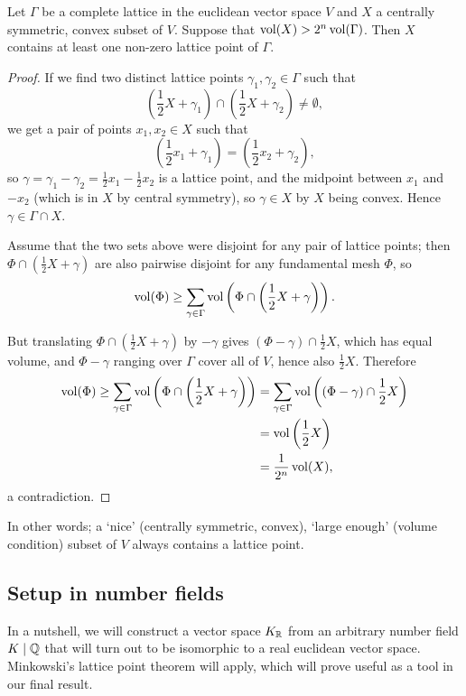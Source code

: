 \begin{thm}
	Let $\Gamma$ be a complete lattice in the euclidean vector space $V$ and $X$ a centrally symmetric, convex subset of $V$. Suppose that $\operatorname{vol}(X) > 2^n\operatorname{vol}(\Gamma)$. Then $X$ contains at least one non-zero lattice point of $\Gamma$.
\end{thm}
\begin{proof}
	If we find two distinct lattice points $\gamma_1,\gamma_2\in\Gamma$ such that
	\[
		\left(\frac{1}{2}X + \gamma_1\right)\cap\left(\frac{1}{2}X + \gamma_2\right) \neq \emptyset,
	\]
	we get a pair of points $x_1,x_2\in X$ such that
	\[
		\left(\frac{1}{2}x_1 + \gamma_1\right) = \left(\frac{1}{2}x_2 + \gamma_2\right),
	\]
	so $\gamma=\gamma_1-\gamma_2=\frac{1}{2}x_1-\frac{1}{2}x_2$ is a lattice point, and the midpoint between $x_1$ and $-x_2$ (which is in $X$ by central symmetry), so $\gamma\in X$ by $X$ being convex. Hence $\gamma\in\Gamma\cap X$.


	Assume that the two sets above were disjoint for any pair of lattice points; then $\Phi\cap\left(\frac{1}{2}X+\gamma\right)$ are also pairwise disjoint for any fundamental mesh $\Phi$, so 
	\[
		\operatorname{vol}(\Phi) \geq \sum_{\gamma\in\Gamma} \operatorname{vol}\left(\Phi\cap\left(\frac{1}{2}X+\gamma\right)\right).
	\]

	But translating $\Phi\cap\left(\frac{1}{2}X+\gamma\right)$ by $-\gamma$ gives $(\Phi-\gamma)\cap\frac{1}{2}X$, which has equal volume, and $\Phi-\gamma$ ranging over $\Gamma$ cover all of $V$, hence also $\frac{1}{2}X$. Therefore
	\begin{align*}
		\operatorname{vol}(\Phi) \geq \sum_{\gamma\in\Gamma} \operatorname{vol}\left(\Phi\cap\left(\frac{1}{2}X+\gamma\right)\right) &= \sum_{\gamma\in\Gamma}\operatorname{vol}\left((\Phi-\gamma)\cap\frac{1}{2}X\right)\\
			&= \operatorname{vol}\left(\frac{1}{2}X\right)\\
			&= \frac{1}{2^n}\operatorname{vol}(X),
	\end{align*}
	a contradiction.
\end{proof}

In other words; a `nice' (centrally symmetric, convex), `large enough' (volume condition) subset of $V$ always contains a lattice point.


\subsection{Setup in number fields}

In a nutshell, we will construct a vector space $K_{\mathbb{R}}$ from an arbitrary number field $K\mid\mathbb{Q}$ that will turn out to be isomorphic to a real euclidean vector space. Minkowski's lattice point theorem will apply, which will prove useful as a tool in our final result.

